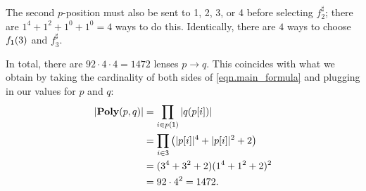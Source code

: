 \documentclass[Book-Poly]{subfiles}
\begin{document}
\begin{example}
  The second $p$-position must also be sent to 1, 2, 3, or 4 before selecting $f^\sharp_2$; there are $1^4+1^2+1^0+1^0=4$ ways to do this.
  Identically, there are $4$ ways to choose $f_{\textsf{1}}(3)$ and $f^\sharp_3$.

  In total, there are $92 \cdot 4 \cdot 4=1472$ lenses $p\to q$.
  This coincides with what we obtain by taking the cardinality of both sides of \eqref{eqn.main_formula} and plugging in our values for $p$ and $q$:
  \begin{align*}
    |\mathbf{Poly}(p, q)| &= \prod_{i \in p(\textsf{1})} |q(p[i])| \\
    &= \prod_{i\in\textsf{3}}\left(|p[i]|^4 + |p[i]|^2 + 2\right) \\
    &= (3^4 + 3^2 + 2)(1^4 + 1^2 + 2)^2 \\
    &= 92 \cdot 4^2 = 1472.
  \end{align*}
\end{example}


\end{document}
